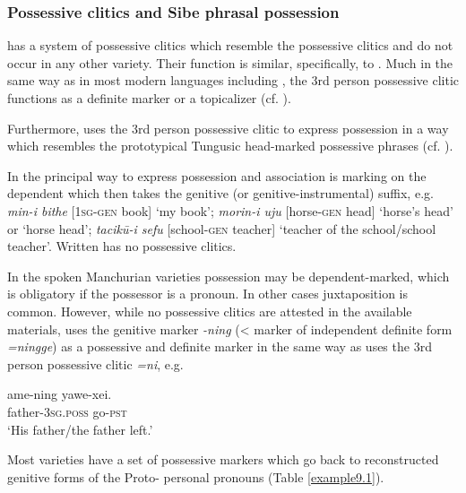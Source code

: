 \documentclass[output=paper,colorlinks,citecolor=brown]{langscibook}
\begin{document}
\subsubsection{Possessive clitics and Sibe phrasal possession}

 has a system of possessive clitics which resemble the  possessive clitics and do not occur in any other  variety. Their function is similar, specifically, to . Much in the same way as in most modern  languages including , the 3rd person possessive clitic functions as a definite marker or a topicalizer (cf. \citealt{Hölzl2017b}).

Furthermore,  uses the 3rd person possessive clitic to express possession in a way which resembles the prototypical Tungusic head-marked possessive phrases (cf. \citealt[45]{Gorelova2002}).


In  the principal way to express possession and association is marking on the dependent which then takes the genitive (or genitive-in\-stru\-men\-tal) suffix, e.g. \textit{min-i bithe} [1\textsc{sg-gen} book] ‘my book’; \textit{morin-i uju} [horse-\textsc{gen} head] ‘horse’s head’ or ‘horse head’; \textit{tacikū-i sefu} [school-\textsc{gen} teacher] ‘teacher of the school/school teacher’. Written  has no possessive clitics.

In the spoken Manchurian varieties possession may be dependent-marked, which is obligatory if the possessor is a pronoun. In other cases juxtaposition is common. However, while no possessive clitics are attested in the available materials,  uses the genitive marker \textit{-ning} (<  marker of independent definite form \textit{=ningge}) as a possessive and definite marker in the same way as  uses the 3rd person possessive clitic \textit{=ni}, e.g.

\ea
    \label{example9.20}
    \gll ame-ning  		yawe-xei.\\
    father-3\textsc{sg.poss} 	go-\textsc{pst}\\
    \glt `His father/the father left.'\\
    \z


Most  varieties have a set of possessive markers which go back to reconstructed genitive forms of the Proto- personal pronouns (Table \ref{example9.1}).
\end{document}

